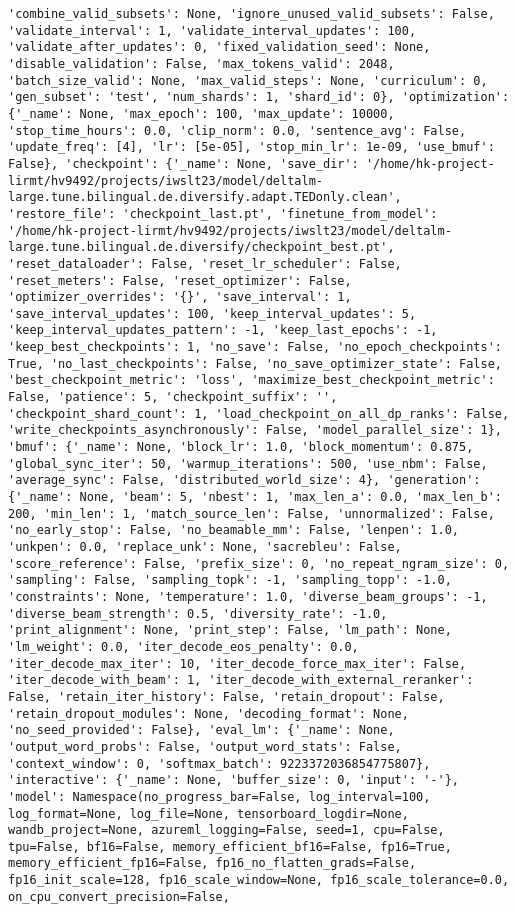 {{{{{{{{{{{{\begin{verbatim}
'combine_valid_subsets': None, 'ignore_unused_valid_subsets': False, 'validate_interval': 1, 'validate_interval_updates': 100, 'validate_after_updates': 0, 'fixed_validation_seed': None, 'disable_validation': False, 'max_tokens_valid': 2048, 'batch_size_valid': None, 'max_valid_steps': None, 'curriculum': 0, 'gen_subset': 'test', 'num_shards': 1, 'shard_id': 0}, 'optimization': {'_name': None, 'max_epoch': 100, 'max_update': 10000, 'stop_time_hours': 0.0, 'clip_norm': 0.0, 'sentence_avg': False, 'update_freq': [4], 'lr': [5e-05], 'stop_min_lr': 1e-09, 'use_bmuf': False}, 'checkpoint': {'_name': None, 'save_dir': '/home/hk-project-lirmt/hv9492/projects/iwslt23/model/deltalm-large.tune.bilingual.de.diversify.adapt.TEDonly.clean', 'restore_file': 'checkpoint_last.pt', 'finetune_from_model': '/home/hk-project-lirmt/hv9492/projects/iwslt23/model/deltalm-large.tune.bilingual.de.diversify/checkpoint_best.pt', 'reset_dataloader': False, 'reset_lr_scheduler': False, 'reset_meters': False, 'reset_optimizer': False, 'optimizer_overrides': '{}', 'save_interval': 1, 'save_interval_updates': 100, 'keep_interval_updates': 5, 'keep_interval_updates_pattern': -1, 'keep_last_epochs': -1, 'keep_best_checkpoints': 1, 'no_save': False, 'no_epoch_checkpoints': True, 'no_last_checkpoints': False, 'no_save_optimizer_state': False, 'best_checkpoint_metric': 'loss', 'maximize_best_checkpoint_metric': False, 'patience': 5, 'checkpoint_suffix': '', 'checkpoint_shard_count': 1, 'load_checkpoint_on_all_dp_ranks': False, 'write_checkpoints_asynchronously': False, 'model_parallel_size': 1}, 'bmuf': {'_name': None, 'block_lr': 1.0, 'block_momentum': 0.875, 'global_sync_iter': 50, 'warmup_iterations': 500, 'use_nbm': False, 'average_sync': False, 'distributed_world_size': 4}, 'generation': {'_name': None, 'beam': 5, 'nbest': 1, 'max_len_a': 0.0, 'max_len_b': 200, 'min_len': 1, 'match_source_len': False, 'unnormalized': False, 'no_early_stop': False, 'no_beamable_mm': False, 'lenpen': 1.0, 'unkpen': 0.0, 'replace_unk': None, 'sacrebleu': False, 'score_reference': False, 'prefix_size': 0, 'no_repeat_ngram_size': 0, 'sampling': False, 'sampling_topk': -1, 'sampling_topp': -1.0, 'constraints': None, 'temperature': 1.0, 'diverse_beam_groups': -1, 'diverse_beam_strength': 0.5, 'diversity_rate': -1.0, 'print_alignment': None, 'print_step': False, 'lm_path': None, 'lm_weight': 0.0, 'iter_decode_eos_penalty': 0.0, 'iter_decode_max_iter': 10, 'iter_decode_force_max_iter': False, 'iter_decode_with_beam': 1, 'iter_decode_with_external_reranker': False, 'retain_iter_history': False, 'retain_dropout': False, 'retain_dropout_modules': None, 'decoding_format': None, 'no_seed_provided': False}, 'eval_lm': {'_name': None, 'output_word_probs': False, 'output_word_stats': False, 'context_window': 0, 'softmax_batch': 9223372036854775807}, 'interactive': {'_name': None, 'buffer_size': 0, 'input': '-'}, 'model': Namespace(no_progress_bar=False, log_interval=100, log_format=None, log_file=None, tensorboard_logdir=None, wandb_project=None, azureml_logging=False, seed=1, cpu=False, tpu=False, bf16=False, memory_efficient_bf16=False, fp16=True, memory_efficient_fp16=False, fp16_no_flatten_grads=False, fp16_init_scale=128, fp16_scale_window=None, fp16_scale_tolerance=0.0, on_cpu_convert_precision=False, 
\end{verbatim}}}}}}}}}}}}}
